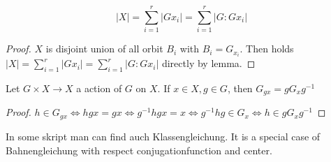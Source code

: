 \begin{theorem}[Bahnengleicung] \label{Bg}
    $$|X| = \sum_{i=1}^r |Gx_i| = \sum_{i=1}^r |G:Gx_i|$$
\end{theorem}
\begin{proof}
    \(X\) is disjoint union of all orbit \(B_i\) with \(B_i = G_{x_i}\). Then holds \(|X| = \sum_{i=1}^r |Gx_i| = \sum_{i=1}^r |G:Gx_i|\) directly by lemma.
\end{proof}

\begin{lemma}
    Let $G\times X \to X$ a action of $G$ on $X$. If \(x\in X,  g\in G\), then \(G_{gx} = gG_xg^{-1}\)
\end{lemma}
\begin{proof}
    \(h\in G_{gx}\Leftrightarrow hgx = gx \Leftrightarrow g^{-1}hgx =x\Leftrightarrow g^{-1}hg \in G_x\Leftrightarrow h\in gG_xg^{-1}\)
\end{proof}

\begin{remark}
    In some skript man can find auch Klassengleichung. It is a special case of Bahnengleichung with respect conjugationfunction and center.
\end{remark}